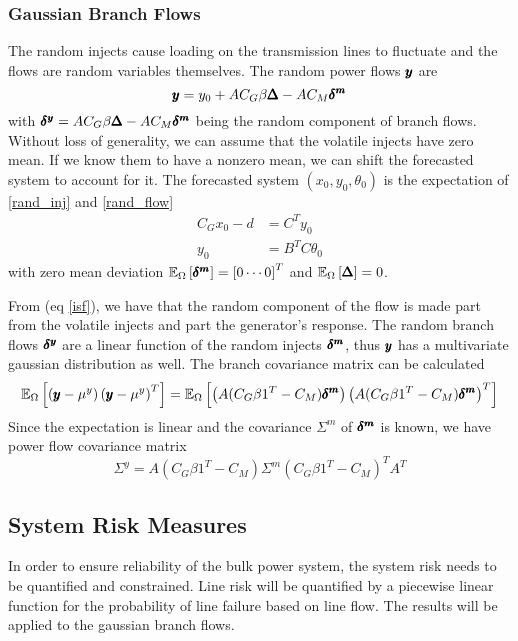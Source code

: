 \subsubsection*{Gaussian Branch Flows}
The random injects cause loading on the transmission lines to fluctuate and the flows are random variables themselves.   The random power flows $\pmb{y}$ are
\begin{equation}\label{rand_flow}
 \pmb{y} = y_0+ A C_G \beta \pmb{\Delta}  - A C_M \pmb{\delta^m} 
\end{equation}
with $\pmb{\delta^y} = A C_G \beta \pmb{\Delta} - AC_M \pmb{\delta^m}$ being the random component of branch flows. Without loss of generality, we can assume that the volatile injects have zero mean.  If we know them to have a nonzero mean, we can shift the forecasted system to account for it. 
The forecasted system  $\left(x_0, y_0, \theta_0\right)$ is the expectation of \ref{rand_inj} and \ref{rand_flow}
\begin{align*}
C_G x_0 - d &= C^T y_0 \\
y_0 &= B^T C \theta_0 
\end{align*}
with zero mean deviation $\mathbb{E}_{\Omega} \left[ \pmb{\delta^m} \right]=\left[0 \cdots 0\right]^T$ and $\mathbb{E}_{\Omega} \left[ \pmb{\Delta} \right]=0$. 

From (eq \ref{isf}), we have that the random component of the flow is made part from the volatile injects and part the generator's response.   The random branch flows $\pmb{\delta^y}$ are a linear function of the random injects $\pmb{\delta^m}$, thus $\pmb{y}$ has a multivariate gaussian distribution as well.  The branch covariance matrix can be calculated
\begin{equation*}
\mathbb{E}_{\Omega} \left[  \left( \pmb{y} - \mu^y \right) \left( \pmb{y} - \mu^y \right)^T  \right] = \mathbb{E}_{\Omega} \left[ \left( A(C_G\beta 1^T - C_M) \pmb{\delta^m} \right) \left( A(C_G\beta 1^T - C_M )\pmb{\delta^m} \right)^T  \right] 
\end{equation*}
Since the expectation is linear and the covariance $\Sigma^m$ of $\pmb{\delta^m}$ is known, we 
have power flow covariance matrix
\begin{equation}\label{branch_cov}
\Sigma^y = A(C_G\beta 1^T - C_M) \Sigma^m (C_G\beta 1^T - C_M)^T A^T
\end{equation}



\subsection{System Risk Measures}
In order to ensure reliability of the bulk power system, the system risk needs to be quantified and constrained.  Line risk will be quantified by a piecewise linear function for the probability of line failure based on line flow.  The results will be applied to the gaussian branch flows.

